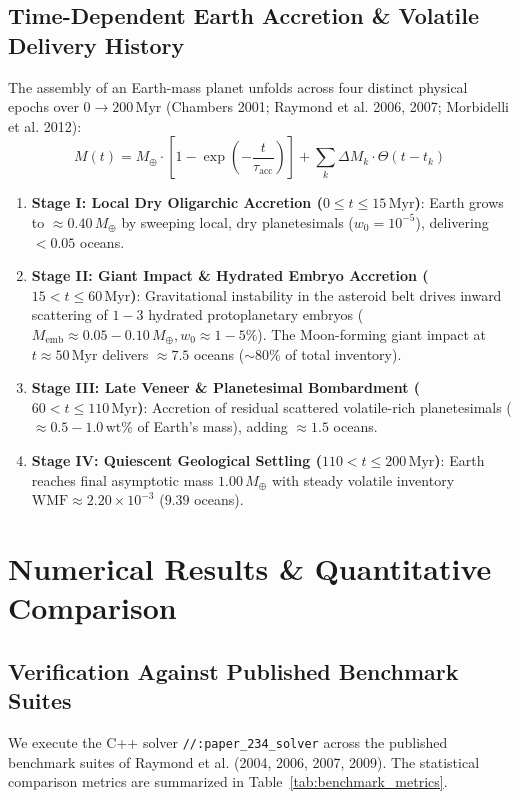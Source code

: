 \documentclass[11pt,a4paper]{article}
\begin{document}
\subsection{Time-Dependent Earth Accretion \& Volatile Delivery History}
The assembly of an Earth-mass planet unfolds across four distinct physical epochs over $0 \to 200\,\text{Myr}$ (Chambers 2001; Raymond et al. 2006, 2007; Morbidelli et al. 2012):
\begin{equation}
M(t) = M_\oplus \cdot \left[ 1 - \exp\left(-\frac{t}{\tau_{\text{acc}}}\right) \right] + \sum_{k} \Delta M_k \cdot \Theta(t - t_k)
\label{eq:mass_time}
\end{equation}
\begin{enumerate}
    \item \textbf{Stage I: Local Dry Oligarchic Accretion ($0 \le t \le 15\,\text{Myr}$)}: Earth grows to $\approx 0.40\,M_\oplus$ by sweeping local, dry planetesimals ($w_0 = 10^{-5}$), delivering $< 0.05$ oceans.
    \item \textbf{Stage II: Giant Impact \& Hydrated Embryo Accretion ($15 < t \le 60\,\text{Myr}$)}: Gravitational instability in the asteroid belt drives inward scattering of $1 - 3$ hydrated protoplanetary embryos ($M_{\text{emb}} \approx 0.05 - 0.10\,M_\oplus, w_0 \approx 1 - 5\%$). The Moon-forming giant impact at $t \approx 50\,\text{Myr}$ delivers $\approx 7.5$ oceans ($\sim 80\%$ of total inventory).
    \item \textbf{Stage III: Late Veneer \& Planetesimal Bombardment ($60 < t \le 110\,\text{Myr}$)}: Accretion of residual scattered volatile-rich planetesimals ($\approx 0.5 - 1.0\,\text{wt}\%$ of Earth's mass), adding $\approx 1.5$ oceans.
    \item \textbf{Stage IV: Quiescent Geological Settling ($110 < t \le 200\,\text{Myr}$)}: Earth reaches final asymptotic mass $1.00\,M_\oplus$ with steady volatile inventory $\text{WMF} \approx 2.20 \times 10^{-3}$ ($9.39$ oceans).
\end{enumerate}

\section{Numerical Results \& Quantitative Comparison}

\subsection{Verification Against Published Benchmark Suites}
We execute the C++ solver \texttt{//:paper\_234\_solver} across the published benchmark suites of Raymond et al. (2004, 2006, 2007, 2009). The statistical comparison metrics are summarized in Table~\ref{tab:benchmark_metrics}.
\end{document}
